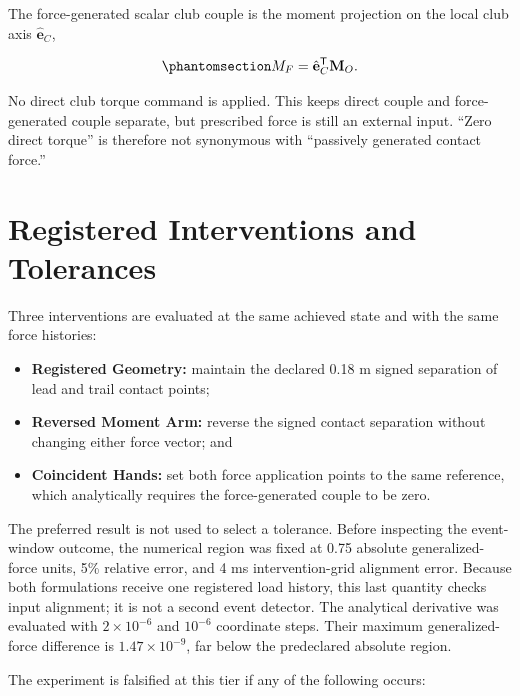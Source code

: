 \documentclass[
  letterpaper,
]{report}
\providecommand{\tightlist}{%
  \setlength{\itemsep}{0pt}\setlength{\parskip}{0pt}}
\begin{document}
The force-generated scalar club couple is the moment projection on the
local club axis \(\hat{\mathbf e}_C\),

\begin{equation}\phantomsection\label{eq-spatial-force-couple}{
M_F=\hat{\mathbf e}_C^{\mathsf T}\mathbf M_O.
}\end{equation}

No direct club torque command is applied. This keeps direct couple and
force-generated couple separate, but prescribed force is still an
external input. ``Zero direct torque'' is therefore not synonymous with
``passively generated contact force.''

\section{Registered Interventions and
Tolerances}\label{sec-spatial-interventions}

Three interventions are evaluated at the same achieved state and with
the same force histories:

\begin{itemize}
\tightlist
\item
  \textbf{Registered Geometry:} maintain the declared 0.18 m signed
  separation of lead and trail contact points;
\item
  \textbf{Reversed Moment Arm:} reverse the signed contact separation
  without changing either force vector; and
\item
  \textbf{Coincident Hands:} set both force application points to the
  same reference, which analytically requires the force-generated couple
  to be zero.
\end{itemize}

The preferred result is not used to select a tolerance. Before
inspecting the event-window outcome, the numerical region was fixed at
0.75 absolute generalized-force units, 5\% relative error, and 4 ms
intervention-grid alignment error. Because both formulations receive one
registered load history, this last quantity checks input alignment; it
is not a second event detector. The analytical derivative was evaluated
with \(2\times10^{-6}\) and \(10^{-6}\) coordinate steps. Their maximum
generalized-force difference is \(1.47\times10^{-9}\), far below the
predeclared absolute region.

The experiment is falsified at this tier if any of the following occurs:
\end{document}

